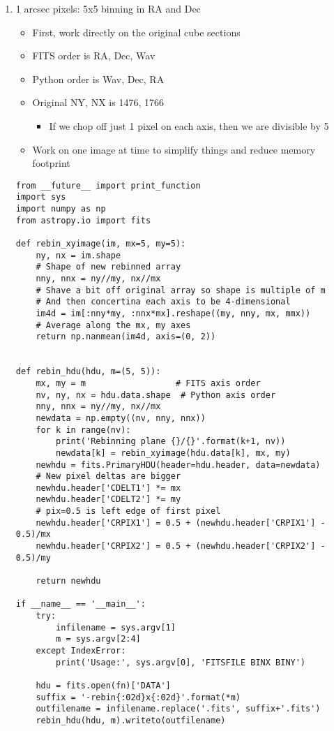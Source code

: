 \documentclass[11pt]{article}
\begin{document}
\begin{enumerate}
\begin{enumerate}
\item 1 arcsec pixels: 5x5 binning in RA and Dec
\label{sec:orgheadline13}
\begin{itemize}
\item First, work directly on the original cube sections
\item FITS order is RA, Dec, Wav
\item Python order is Wav, Dec, RA
\item Original NY, NX is 1476, 1766
\begin{itemize}
\item If we chop off just 1 pixel on each axis, then we are divisible by 5
\end{itemize}
\item Work on one image at time to simplify things and reduce memory footprint
\end{itemize}
\begin{verbatim}
from __future__ import print_function
import sys
import numpy as np
from astropy.io import fits

def rebin_xyimage(im, mx=5, my=5):
    ny, nx = im.shape
    # Shape of new rebinned array
    nny, nnx = ny//my, nx//mx
    # Shave a bit off original array so shape is multiple of m
    # And then concertina each axis to be 4-dimensional
    im4d = im[:nny*my, :nnx*mx].reshape((my, nny, mx, mmx))
    # Average along the mx, my axes
    return np.nanmean(im4d, axis=(0, 2))


def rebin_hdu(hdu, m=(5, 5)):
    mx, my = m                  # FITS axis order
    nv, ny, nx = hdu.data.shape  # Python axis order
    nny, nnx = ny//my, nx//mx
    newdata = np.empty((nv, nny, nnx))
    for k in range(nv):
        print('Rebinning plane {}/{}'.format(k+1, nv))
        newdata[k] = rebin_xyimage(hdu.data[k], mx, my)
    newhdu = fits.PrimaryHDU(header=hdu.header, data=newdata)
    # New pixel deltas are bigger
    newhdu.header['CDELT1'] *= mx
    newhdu.header['CDELT2'] *= my
    # pix=0.5 is left edge of first pixel
    newhdu.header['CRPIX1'] = 0.5 + (newhdu.header['CRPIX1'] - 0.5)/mx
    newhdu.header['CRPIX2'] = 0.5 + (newhdu.header['CRPIX2'] - 0.5)/my

    return newhdu

if __name__ == '__main__':
    try:
        infilename = sys.argv[1]
        m = sys.argv[2:4]
    except IndexError:
        print('Usage:', sys.argv[0], 'FITSFILE BINX BINY')

    hdu = fits.open(fn)['DATA']
    suffix = '-rebin{:02d}x{:02d}'.format(*m)
    outfilename = infilename.replace('.fits', suffix+'.fits')
    rebin_hdu(hdu, m).writeto(outfilename)
\end{verbatim}


\end{enumerate}
\end{enumerate}
\end{document}
